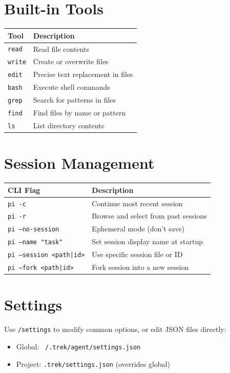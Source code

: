 \documentclass[12pt]{article}
\begin{document}
\section{Built-in Tools}

\begin{tabular}{@{}ll@{}}
\toprule
\textbf{Tool} & \textbf{Description} \\
\midrule
\texttt{read} & Read file contents \\
\texttt{write} & Create or overwrite files \\
\texttt{edit} & Precise text replacement in files \\
\texttt{bash} & Execute shell commands \\
\texttt{grep} & Search for patterns in files \\
\texttt{find} & Find files by name or pattern \\
\texttt{ls} & List directory contents \\
\bottomrule
\end{tabular}

\section{Session Management}

\begin{tabular}{@{}ll@{}}
\toprule
\textbf{CLI Flag} & \textbf{Description} \\
\midrule
\texttt{pi -c} & Continue most recent session \\
\texttt{pi -r} & Browse and select from past sessions \\
\texttt{pi --no-session} & Ephemeral mode (don't save) \\
\texttt{pi --name "task"} & Set session display name at startup \\
\texttt{pi --session <path|id>} & Use specific session file or ID \\
\texttt{pi --fork <path|id>} & Fork session into a new session \\
\bottomrule
\end{tabular}

\section{Settings}

Use \texttt{/settings} to modify common options, or edit JSON files directly:

\begin{itemize}
    \item Global: \texttt{~/.trek/agent/settings.json}
    \item Project: \texttt{.trek/settings.json} (overrides global)
\end{itemize}
\end{document}
